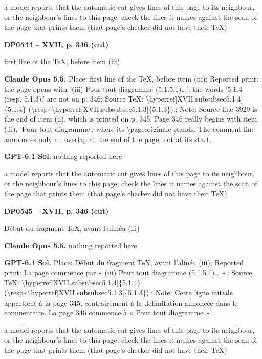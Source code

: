 a model reports that the automatic cut gives lines of this page to its neighbour, or the neighbour's lines to this page: check the lines it names against the scan of the page that prints them (that page's checker did not have their TeX)\par
\par\noindent\hypertarget{DP0544}{}\textbf{DP0544 -- XVII, p. 346 (cut)}\par
first line of the TeX, before item (iii)\par
\textbf{Claude Opus 5.5.} Place: first line of the TeX, before item (iii); Reported print: the page opens with '(iii) Pour tout diagramme (5.1.5.1)…'; the words '5.1.4 (resp. 5.1.3).' are not on p. 346; Source TeX: \textbackslash{}hyperref[XVII.subsubsec5.1.4]\{5.1.4\} (\textbackslash{}resp\textasciitilde{}\textbackslash{}hyperref[XVII.subsubsec5.1.3]\{5.1.3\}).; Note: Source line 3929 is the end of item (ii), which is printed on p. 345. Page 346 really begins with item (iii), 'Pour tout diagramme', where its \textbackslash{}pageoriginale stands. The comment line announces only an overlap at the end of the page, not at its start.\par
\textbf{GPT-6.1 Sol.} nothing reported here\par
a model reports that the automatic cut gives lines of this page to its neighbour, or the neighbour's lines to this page: check the lines it names against the scan of the page that prints them (that page's checker did not have their TeX)\par
\par\noindent\hypertarget{DP0545}{}\textbf{DP0545 -- XVII, p. 346 (cut)}\par
Début du fragment TeX, avant l’alinéa (iii)\par
\textbf{Claude Opus 5.5.} nothing reported here\par
\textbf{GPT-6.1 Sol.} Place: Début du fragment TeX, avant l’alinéa (iii); Reported print: La page commence par « (iii) Pour tout diagramme (5.1.5.1)… ».; Source TeX: \textbackslash{}hyperref[XVII.subsubsec5.1.4]\{5.1.4\} (\textbackslash{}resp\textasciitilde{}\textbackslash{}hyperref[XVII.subsubsec5.1.3]\{5.1.3\}).; Note: Cette ligne initiale appartient à la page 345, contrairement à la délimitation annoncée dans le commentaire. La page 346 commence à « Pour tout diagramme ».\par
a model reports that the automatic cut gives lines of this page to its neighbour, or the neighbour's lines to this page: check the lines it names against the scan of the page that prints them (that page's checker did not have their TeX)\par
